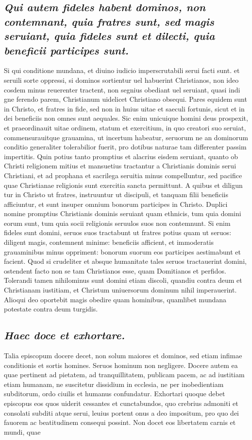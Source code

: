 \documentclass{article}
\begin{document}
\begin{pages}
\subsection*{\textit{Qui autem fideles habent dominos, non contemnant, quia fratres sunt, sed magis seruiant, quia fideles sunt et dilecti, quia beneficii participes sunt. }}\pstart Si qui conditione mundana, et diuino iudicio imperscrutabili serui facti sunt. et seruili sorte oppressi, si dominos sortientur uel habuerint Christianos, non ideo cosdem minus reuerenter tractent, non segnius obediant uel seruiant, quasi indi gne ferendo parem, Christianum uidelicet Christiano obsequi. Pares equidem sunt in Christo, et fratres in fide, sed non in huius uitae et saeculi fortunis, sicut et in dei beneficiis non omnes sunt aequales. Sic enim unicuique homini deus prospexit, et praeordinauit uitae ordinem, statum et exercitium, in quo creatori suo seruiat, commensurauitque grauamina, ut incertum habeatur, seruorum ne an dominorum conditio generaliter tolerabilior fuerit, pro dotibus naturae tam differenter passim impertitis. Quin potius tanto promptius et alacrius eisdem seruiant, quanto ob Christi religionem mitius et mansuetius tractantur a Christianis dominis serui Christiani, et ad prophana et sacrilega seruitia minus compelluntur, sed pacifice quae Christianae religionis sunt exercitia sancta permittunt. A quibus et diligun tur in Christo ut fratres, instruuntur ut discipuli, et tanquam filii beneficiis afficiuntur, et sunt insuper omnium bonorum participes in Christo. Duplici nomine promptius Christianis dominis seruiant quam ethnicis, tum quia domini eorum sunt, tum quia socii religionis seruulos suos non contemnunt. Si enim fideles sunt domini, seruos suos tractabunt ut fratres potius quam ut seruos: diligent magis, contemnent minime: beneficiis afficient, et immoderatis grauaminibus minus oppriment: bonorum suorum eos participes aestimabunt et facient. Quod si crudeliter et absque humanitate tales seruos tractauerint domini, ostendent facto non se tam Christianos esse, quam Domitianos et perfidos. Tolerandi tamen nihilominus sunt domini etiam discoli, quandiu contra deum et Christianam iustitiam, et Christum uniuersorum dominum nihil imperauerint. Alioqui deo oportebit magis obedire quam hominibus, quamlibet mundana potestate contra deum turgidis.  \pend
{}
{}
\subsection*{\textit{Haec doce et exhortare. }}\pstart Talia episcopum docere decet, non solum maiores et dominos, sed etiam infimae conditionis et sortis homines. Seruos hominum non negligere. Docere autem ea quae pertinent ad pietatem, ad tranquillitatem, publicam pacem, ac ad iustitiam etiam humanam, ne suscitetur dissidium in ecclesia, ne per inobedientiam subditorum, ordo ciuilis et humanus confundatur. Exhortari quoque debet episcopus eos quos uiderit cessantes et cunctabundos, quo crebrius admoniti et consolati subditi atque serui, leuius portent onus a deo impositum, pro quo dei fauorem ac beatitudinem consequi possint. Non docet eos libertatem carnis et mundi, quae  \pend

\end{pages}
\end{document}
